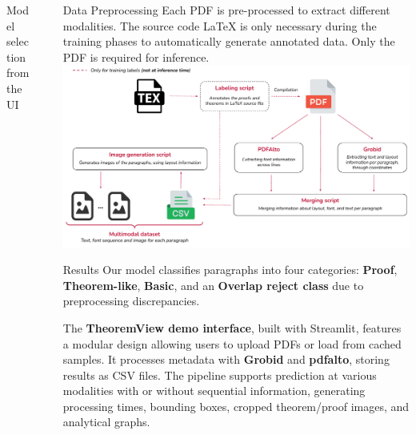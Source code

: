 \documentclass[final]{beamer}
\newlength{\sepwidth}
\newlength{\colwidth}
\newcommand{\separatorcolumn}{\begin{column}{\sepwidth}\end{column}}
\begin{document}
\begin{frame}[t]
\begin{columns}[t]
\begin{column}{\colwidth}
\begin{block}{Model selection from the UI}
			\end{block}

		\end{column}

		\separatorcolumn

		\begin{column}{\colwidth}

			\begin{block}{Data Preprocessing}
				Each PDF is pre-processed to extract different modalities. The source code \LaTeX{} is only necessary during the training phases to automatically generate annotated data. Only the PDF is required for inference.
				\includegraphics[width=\linewidth]{preprocessing}
			\end{block}

			\begin{block}{Results}
				Our model classifies paragraphs into four categories: \textbf{Proof}, \textbf{Theorem-like}, \textbf{Basic}, and an \textbf{Overlap reject class} due to preprocessing discrepancies. 
				
				
				The \textbf{TheoremView demo interface}, built with Streamlit, features a modular design allowing users to upload PDFs or load from cached samples. It processes metadata with \textbf{Grobid} and \textbf{pdfalto}, storing results as CSV files. The pipeline supports prediction at various modalities with or without sequential information, generating processing times, bounding boxes, cropped theorem/proof images, and analytical graphs.


\end{block}
\end{column}
\end{columns}
\end{frame}
\end{document}
